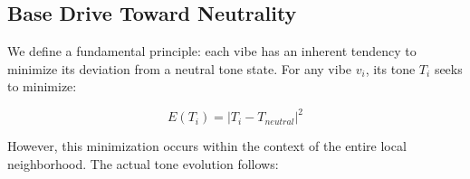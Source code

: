 \documentclass{article}
\begin{document}
\subsection{Base Drive Toward Neutrality}

We define a fundamental principle: each vibe has an inherent tendency to minimize its deviation from a neutral tone state. For any vibe $v_i$, its tone $T_i$ seeks to minimize:

\[
E(T_i) = |T_i - T_{neutral}|^2
\]

However, this minimization occurs within the context of the entire local neighborhood. The actual tone evolution follows:
\end{document}

